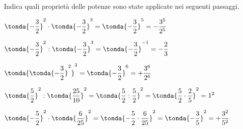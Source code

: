 \begin{esercizio}
\label{ese:3.57}
Indica quali proprietà delle potenze sono state applicate nei seguenti 
passaggi.
\begin{enumeratees}
\spazielenx
 \item 
\(\displaystyle{\tonda{-\frac{3}{2}}^2\cdot\tonda{-\frac{3}{2}}^{3}=
\tonda{-\frac{3}{2}}^{5}=-\frac{3^5}{2^5}}\)
 \item 
\(\displaystyle{\tonda{-\frac{3}{2}}^2:\tonda{-\frac{3}{2}}^{3}=
  \tonda{-\frac{3}{2}}^{-1} = -\frac{2}{3}}\)
 \item 
\(\displaystyle{\tonda{\tonda{-\frac{3}{2}}^2}^3 =
  \tonda{-\frac{3}{2}}^{6} = +\frac{3^6}{2^6}}\)
 \item 
\(\displaystyle{\tonda{\frac{5}{2}}^2:\tonda{\frac{25}{10}}^2=
 \tonda{\frac{5}{2}:\frac{5}{2}}^2 =
\tonda{\frac{5}{2}\cdot\frac{2}{5}}^2 = 1^2}\)
 \item 
\(\displaystyle{\tonda{-\frac{5}{2}}^{2}\cdot\tonda{\frac{6}{25} }^{2}=
  \tonda{-\frac{5}{2} \cdot \frac{6}{25}}^{2}=
  \tonda{-\frac{3}{5}}^2 = +\frac{3^2}{5^2}}\)
\end{enumeratees}
\end{esercizio}

